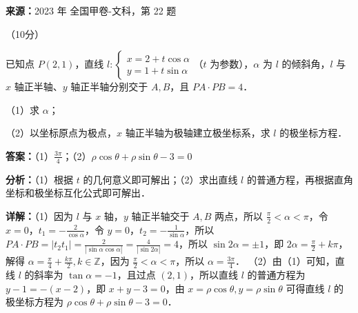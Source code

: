 \begin{question}[points=10]
\textbf{来源：}2023 年 全国甲卷-文科，第 22 题\par
[选修4-4：坐标系与参数方程]（10分）

已知点 $P(2,1)$，直线 $l: \begin{cases}x=2+t\cos\alpha\\ y=1+t\sin\alpha\end{cases}$（$t$ 为参数），$\alpha$ 为 $l$ 的倾斜角，$l$ 与 $x$ 轴正半轴、$y$ 轴正半轴分别交于 $A,B$，且 $PA\cdot PB=4$．

（1）求 $\alpha$；

（2）以坐标原点为极点，$x$ 轴正半轴为极轴建立极坐标系，求 $l$ 的极坐标方程．
\begin{solution}
\textbf{答案：}（1）$\frac{3\pi}{4}$；（2）$\rho\cos\theta+\rho\sin\theta-3=0$

\textbf{分析：}（1）根据 $t$ 的几何意义即可解出；（2）求出直线 $l$ 的普通方程，再根据直角坐标和极坐标互化公式即可解出．

\textbf{详解：}（1）因为 $l$ 与 $x$ 轴，$y$ 轴正半轴交于 $A,B$ 两点，所以 $\frac{\pi}{2}<\alpha<\pi$，令 $x=0$，$t_1=-\frac{2}{\cos\alpha}$，令 $y=0$，$t_2=-\frac{1}{\sin\alpha}$，所以 $PA\cdot PB=|t_2t_1|=\frac{2}{|\sin\alpha\cos\alpha|}=\frac{4}{|\sin2\alpha|}=4$，所以 $\sin2\alpha=\pm1$，即 $2\alpha=\frac{\pi}{2}+k\pi$，解得 $\alpha=\frac{\pi}{4}+\frac{k\pi}{2},k\in\mathbb{Z}$，因为 $\frac{\pi}{2}<\alpha<\pi$，所以 $\alpha=\frac{3\pi}{4}$．
（2）由（1）可知，直线 $l$ 的斜率为 $\tan\alpha=-1$，且过点 $(2,1)$，所以直线 $l$ 的普通方程为 $y-1=-(x-2)$，即 $x+y-3=0$，由 $x=\rho\cos\theta, y=\rho\sin\theta$ 可得直线 $l$ 的极坐标方程为 $\rho\cos\theta+\rho\sin\theta-3=0$．
\end{solution}
\end{question}

